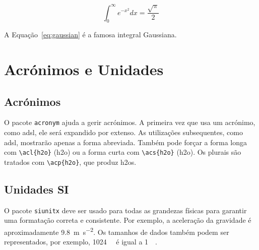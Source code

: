 \begin{equation}
    \int_0^\infty e^{-x^2} dx = \frac{\sqrt{\pi}}{2}
    \label{eq:gaussian}
\end{equation}

A Equação~\ref{eq:gaussian} é a famosa integral Gaussiana.

\section{Acrónimos e Unidades}

\subsection{Acrónimos}
O pacote \texttt{acronym} ajuda a gerir acrónimos. A primeira vez que usa um acrónimo, como \ac{adsl}, ele será expandido por extenso. As utilizações subsequentes, como \ac{adsl}, mostrarão apenas a forma abreviada. Também pode forçar a forma longa com \verb|\acl{h2o}| (\acl{h2o}) ou a forma curta com \verb|\acs{h2o}| (\acs{h2o}). Os plurais são tratados com \verb|\acp{h2o}|, que produz \acp{h2o}.


\subsection{Unidades SI}
O pacote \texttt{siunitx} deve ser usado para todas as grandezas físicas para garantir uma formatação correta e consistente. Por exemplo, a aceleração da gravidade é aproximadamente \SI{9.8}{\metre\per\second\squared}. Os tamanhos de dados também podem ser representados, por exemplo, \SI{1024}{\kibi\byte} é igual a \SI{1}{\mebi\byte}.